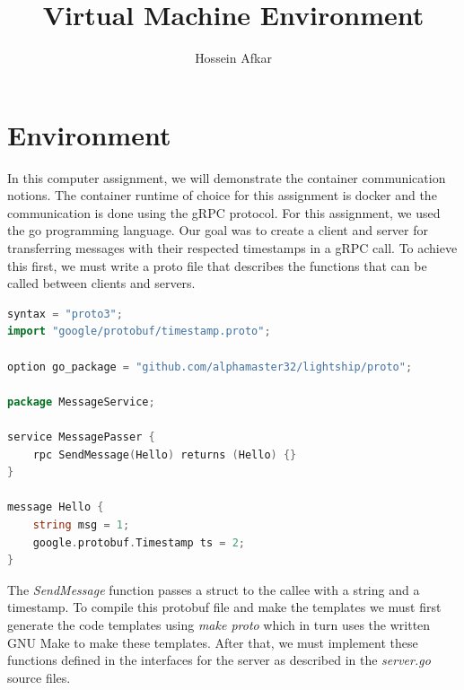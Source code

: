 \documentclass[a4paper, 11pt]{article}
\title{Virtual Machine Environment}
\author{Hossein Afkar}
\theoremstyle{nonumberplain}
\begin{document}
\maketitle

\section{Environment}
In this computer assignment, we will demonstrate the container communication
notions. The container runtime of choice for this assignment is docker and the
communication is done using the gRPC protocol. For this assignment,
we used the go programming language. Our goal was to create a client and server
for transferring messages with their respected timestamps in a gRPC call.
To achieve this first, we must write a proto file that describes the functions
that can be called between clients and servers.

\begin{lstlisting}[language=go]
syntax = "proto3";
import "google/protobuf/timestamp.proto";

option go_package = "github.com/alphamaster32/lightship/proto";

package MessageService;

service MessagePasser {
    rpc SendMessage(Hello) returns (Hello) {}
}

message Hello {
    string msg = 1;
    google.protobuf.Timestamp ts = 2;
}

\end{lstlisting}
The \textit{SendMessage} function passes a struct to the callee with a string
and a timestamp. To compile this protobuf file and make the templates we must
first generate the code templates using \textit{make proto} which in turn uses
the written GNU Make to make these templates. After that, we must implement
these functions defined in the interfaces for the server as described in the
\textit{server.go} source files.
\end{document}

